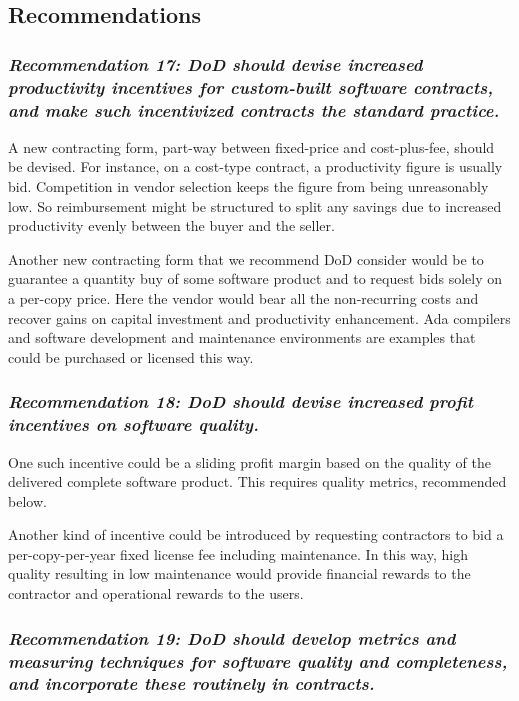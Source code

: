 \documentclass[12pt,final]{article}
\begin{document}
\subsection*{Recommendations}

\label{rec:17}
\subsubsection*{\textit{Recommendation 17: DoD should devise increased productivity incentives
for custom-built software contracts, and make such incentivized contracts the
standard practice.}}

A new contracting form, part-way between fixed-price and cost-plus-fee, should
be devised. For instance, on a cost-type contract, a productivity figure is
usually bid.  Competition in vendor selection keeps the figure from being
unreasonably low. So reimbursement might be structured to split any savings due
to increased productivity evenly between the buyer and the seller.

Another new contracting form that we recommend DoD consider would be to
guarantee a quantity buy of some software product and to request bids solely on
a per-copy price. Here the vendor would bear all the non-recurring costs and
recover gains on capital investment and productivity enhancement. Ada compilers
and software development and maintenance environments are examples that could
be purchased or licensed this way.

\label{rec:18}
\subsubsection*{\textit{Recommendation 18: DoD should devise increased profit incentives on
software quality.}}

One such incentive could be a sliding profit margin based on the quality of the
delivered complete software product. This requires quality metrics, recommended
below.

Another kind of incentive could be introduced by requesting contractors to bid
a per-copy-per-year fixed license fee including maintenance. In this way, high
quality resulting in low maintenance would provide financial rewards to the
contractor and operational rewards to the users.

\label{rec:19}
\subsubsection*{\textit{Recommendation 19: DoD should develop metrics and
measuring techniques for software quality and completeness, and incorporate
these routinely in contracts.}}
\end{document}

